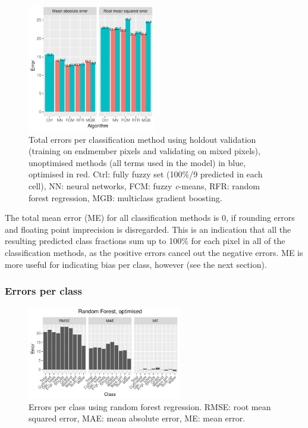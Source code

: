 \documentclass[a4paper,12pt]{scrbook}
\begin{document}
\begin{figure}
  \centering
  \includegraphics[width=0.5\textwidth]{../plot/total-errors-gb}
  \caption{Total errors per classification method using holdout validation (training on endmember pixels and validating on mixed pixels), unoptimised methods (all terms used in the model) in blue, optimised in red. Ctrl: fully fuzzy set (100\%/9 predicted in each cell), NN: neural networks, FCM: fuzzy \textit{c}-means, RFR: random forest regression, MGB: multiclass gradient boosting.}
  \label{fig-total-errors-gb}
\end{figure}

The total mean error (ME) for all classification methods is 0, if rounding errors and floating point imprecision is disregarded. This is an indication that all the resulting predicted class fractions sum up to 100\% for each pixel in all of the classification methods, as the positive errors cancel out the negative errors. ME is more useful for indicating bias per class, however (see the next section).

\subsubsection{Errors per class}

\begin{figure}
  \centering
  \includegraphics[width=0.6\textwidth]{../plot/perclass-errors-rf}
  \caption{Errors per class using random forest regression. RMSE: root mean squared error, MAE: mean absolute error, ME: mean error.}
  \label{fig-perclass-errors-rf}
\end{figure}
\end{document}

